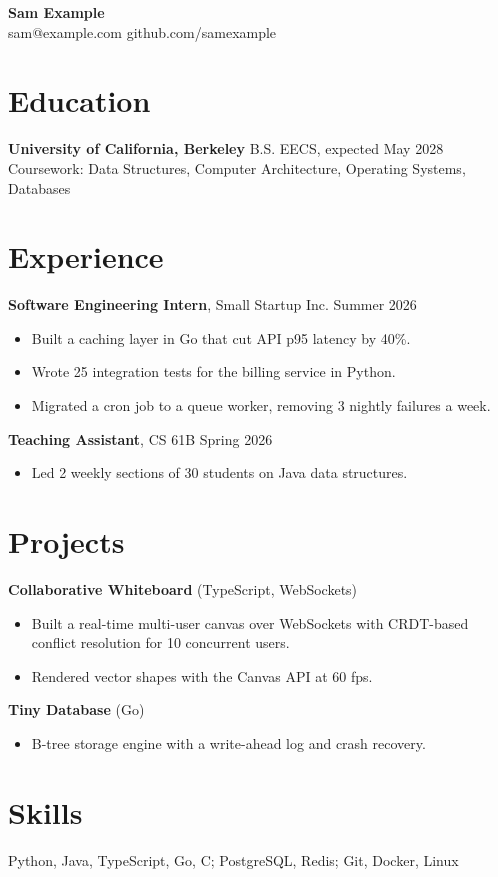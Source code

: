 \documentclass[10pt]{article}
\begin{document}
\begin{center}{\Large\bfseries Sam Example}\\ sam@example.com \textbar{} github.com/samexample\end{center}
\section*{Education}
\textbf{University of California, Berkeley} \hfill B.S. EECS, expected May 2028\\
Coursework: Data Structures, Computer Architecture, Operating Systems, Databases
\section*{Experience}
\textbf{Software Engineering Intern}, Small Startup Inc. \hfill Summer 2026
\begin{itemize}
\item Built a caching layer in Go that cut API p95 latency by 40\%.
\item Wrote 25 integration tests for the billing service in Python.
\item Migrated a cron job to a queue worker, removing 3 nightly failures a week.
\end{itemize}
\textbf{Teaching Assistant}, CS 61B \hfill Spring 2026
\begin{itemize}
\item Led 2 weekly sections of 30 students on Java data structures.
\end{itemize}
\section*{Projects}
\textbf{Collaborative Whiteboard} (TypeScript, WebSockets)
\begin{itemize}
\item Built a real-time multi-user canvas over WebSockets with CRDT-based conflict resolution for 10 concurrent users.
\item Rendered vector shapes with the Canvas API at 60 fps.
\end{itemize}
\textbf{Tiny Database} (Go)
\begin{itemize}
\item B-tree storage engine with a write-ahead log and crash recovery.
\end{itemize}
\section*{Skills}
Python, Java, TypeScript, Go, C; PostgreSQL, Redis; Git, Docker, Linux
\end{document}
